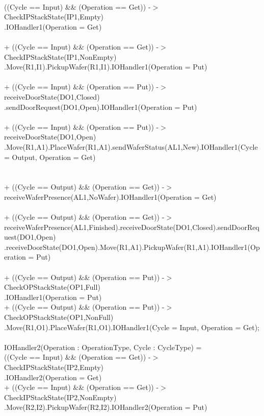 \documentclass[a4paper,12pt]{article}
\begin{document}
	\\((Cycle == Input) \&\& (Operation == Get)) -$>$ CheckIPStackState(IP1,Empty)
	\\.IOHandler1(Operation = Get)
	\\
	\\+ ((Cycle == Input) \&\& (Operation == Get)) -$>$ CheckIPStackState(IP1,NonEmpty)
	\\.Move(R1,I1).PickupWafer(R1,I1).IOHandler1(Operation = Put)
	\\
	\\+ ((Cycle == Input) \&\& (Operation == Put)) -$>$ receiveDoorState(DO1,Closed)
	\\.sendDoorRequest(DO1,Open).IOHandler1(Operation = Put)
	\\
	\\+ ((Cycle == Input) \&\& (Operation == Put)) -$>$ receiveDoorState(DO1,Open)
	\\.Move(R1,A1).PlaceWafer(R1,A1).sendWaferStatus(AL1,New).IOHandler1(Cycle = Output, Operation = Get)
	\\
	\\
	\\+ ((Cycle == Output) \&\& (Operation == Get)) -$>$ receiveWaferPresence(AL1,NoWafer).IOHandler1(Operation = Get)
	\\
	\\+ ((Cycle == Output) \&\& (Operation == Get)) -$>$ receiveWaferPresence(AL1,Finished).receiveDoorState(DO1,Closed).sendDoorRequest(DO1,Open)
	.receiveDoorState(DO1,Open).Move(R1,A1).PickupWafer(R1,A1).IOHandler1(Operation = Put)
	\\
	\\+ ((Cycle == Output) \&\& (Operation == Put)) -$>$ CheckOPStackState(OP1,Full)
	\\.IOHandler1(Operation = Put)
	\\+ ((Cycle == Output) \&\& (Operation == Put)) -$>$ CheckOPStackState(OP1,NonFull)
	\\.Move(R1,O1).PlaceWafer(R1,O1).IOHandler1(Cycle = Input, Operation = Get);
	\\
	\\IOHandler2(Operation : OperationType, Cycle : CycleType) =
	\\((Cycle == Input) \&\& (Operation == Get)) -$>$ CheckIPStackState(IP2,Empty)
	\\.IOHandler2(Operation = Get)
	\\+ ((Cycle == Input) \&\& (Operation == Get)) -$>$ CheckIPStackState(IP2,NonEmpty)
	\\.Move(R2,I2).PickupWafer(R2,I2).IOHandler2(Operation = Put)
\end{document}
